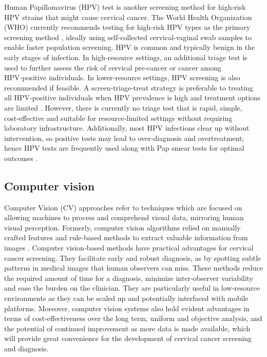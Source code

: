\documentclass[final,5p,times,twocolumn,authoryear]{elsarticle}
\begin{document}
Human Papillomavirus (HPV) test is another screening method for high‑risk HPV strains that might cause cervical cancer. The World Health Organization (WHO) currently recommends testing for high‑risk HPV types as the primary screening method \cite{ref9}, ideally using self‑collected cervical‑vaginal swab samples to enable faster population screening. HPV is common and typically benign in the early stages of infection. In high‑resource settings, an additional triage test is used to further assess the risk of cervical pre‑cancer or cancer among HPV‑positive individuals. In lower‑resource settings, HPV screening is also recommended if feasible. A screen‑triage‑treat strategy is preferable to treating all HPV‑positive individuals when HPV prevalence is high and treatment options are limited \cite{ref10}. However, there is currently no triage test that is rapid, simple, cost‑effective and suitable for resource‑limited settings without requiring laboratory infrastructure. Additionally, most HPV infections clear up without intervention, so positive tests may lead to over‑diagnosis and overtreatment; hence HPV tests are frequently used along with Pap smear tests for optimal outcomes \cite{ref11}.
\subsection{Computer vision}
Computer Vision (CV) approaches refer to techniques which are focused on allowing machines to process and comprehend visual data, mirroring human visual perception. Formerly, computer vision algorithms relied on manually crafted features and rule‑based methods to extract valuable information from images \cite{ref11}. Computer vision‑based methods have practical advantages for cervical cancer screening. They facilitate early and robust diagnosis, as by spotting subtle patterns in medical images that human observers can miss. These methods reduce the required amount of time for a diagnosis, minimize inter‑observer variability and ease the burden on the clinician. They are particularly useful in low‑resource environments as they can be scaled up and potentially interfaced with mobile platforms. Moreover, computer vision systems also hold evident advantages in terms of cost‑effectiveness over the long term, uniform and objective analysis, and the potential of continued improvement as more data is made available, which will provide great convenience for the development of cervical cancer screening and diagnosis.
\end{document}
